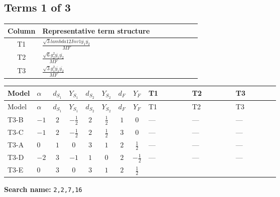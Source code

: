 \documentclass[8pt]{article}
\begin{document}
\begin{landscape}
\subsection*{Terms 1 of 3}
\begin{center}
\begin{tabular}{@{}c >{\raggedright\arraybackslash}p{0.82\linewidth}@{}}
\toprule
Column & Representative term structure \\
\midrule
T1 & \(\displaystyle \frac{\sqrt{3} lambda12Inv1 \overline{y_{1}} \overline{y_{2}}}{MF}\) \\
\midrule
T2 & \(\displaystyle \frac{\sqrt{6} g_{2}^{2} \overline{y_{1}} \overline{y_{2}}}{MF}\) \\
\midrule
T3 & \(\displaystyle \frac{\sqrt{3} g_{1}^{2} \overline{y_{1}} \overline{y_{2}}}{MF}\) \\
\midrule
\bottomrule
\end{tabular}
\end{center}
\smallskip
\tiny
\begin{longtable}{@{}llcccccc >{\raggedright\arraybackslash}p{0.21\linewidth} >{\raggedright\arraybackslash}p{0.21\linewidth} >{\raggedright\arraybackslash}p{0.21\linewidth}@{}}
\toprule
Model & $\alpha$ & $d_{S_1}$ & $Y_{S_1}$ & $d_{S_2}$ & $Y_{S_2}$ & $d_F$ & $Y_F$ & T1 & T2 & T3 \\
\midrule
\endfirsthead
\toprule
Model & $\alpha$ & $d_{S_1}$ & $Y_{S_1}$ & $d_{S_2}$ & $Y_{S_2}$ & $d_F$ & $Y_F$ & T1 & T2 & T3 \\
\midrule
\endhead
T3-B & $-1$ & $2$ & $-\frac{1}{2}$ & $2$ & $\frac{1}{2}$ & $1$ & $0$ & --- & --- & --- \\
\midrule
T3-C & $-1$ & $2$ & $-\frac{1}{2}$ & $2$ & $\frac{1}{2}$ & $3$ & $0$ & --- & --- & --- \\
\midrule
T3-A & $0$ & $1$ & $0$ & $3$ & $1$ & $2$ & $\frac{1}{2}$ & --- & --- & --- \\
\midrule
T3-D & $-2$ & $3$ & $-1$ & $1$ & $0$ & $2$ & $-\frac{1}{2}$ & --- & --- & --- \\
\midrule
T3-E & $0$ & $3$ & $0$ & $3$ & $1$ & $2$ & $\frac{1}{2}$ & \scriptsize\adjustbox{max width=\linewidth}{$\begin{gathered} - \frac{\sqrt{3} lambda12Inv1 \overline{y_{1}} \overline{y_{2}}}{6 MF}\end{gathered}$} & \scriptsize\adjustbox{max width=\linewidth}{$\begin{gathered} \frac{\sqrt{6} g_{2}^{2} \overline{y_{1}} \overline{y_{2}}}{3 MF}\end{gathered}$} & \scriptsize\adjustbox{max width=\linewidth}{$\begin{gathered} \frac{\sqrt{3} g_{1}^{2} \overline{y_{1}} \overline{y_{2}}}{8 MF}\end{gathered}$} \\
\midrule
\bottomrule
\end{longtable}
\clearpage
\noindent\textbf{Search name: }\texttt{2,2,7,16}\par\smallskip

\end{landscape}
\end{document}
